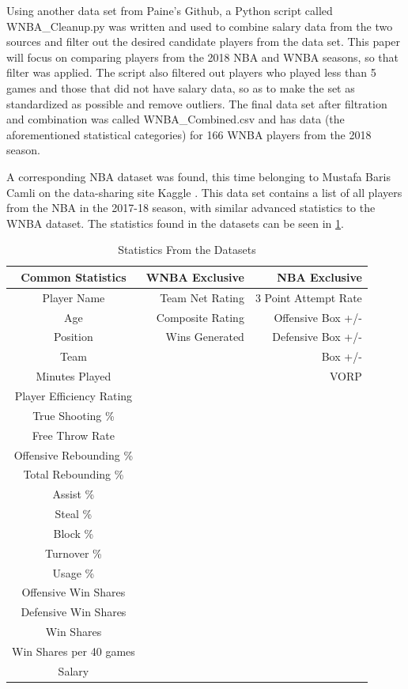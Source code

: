 \documentclass[12pt, titlepage]{article}
\begin{document}
\par
Using another data set from Paine’s Github, a Python script called WNBA\_Cleanup.py was written and used to combine salary data from the two sources and 
filter out the desired candidate players from the data set. This paper will focus on comparing players from the 2018 NBA and WNBA seasons, so that filter 
was applied. The script also filtered out players who played less than 5 games and those that did not have salary data, so as to make the set as 
standardized as possible and remove outliers. The final data set after filtration and combination was called WNBA\_Combined.csv and has data (the 
aforementioned statistical categories) for 166 WNBA players from the 2018 season.
\par
A corresponding NBA dataset was found, this time belonging to Mustafa Baris Camli on the data-sharing site Kaggle \citep{nba}. This data set contains a 
list of all players from the NBA in the 2017-18 season, with similar advanced statistics to the WNBA dataset. The statistics found in the datasets can be 
seen in \ref{tab:stats}.

\begin{table}[tbp]
    \caption{Statistics From the Datasets}
    \label{tab:stats}
\centering
\begin{tabular}{crr}
\toprule

Common Statistics & WNBA Exclusive & NBA Exclusive\\ 
\midrule
 Player Name  &  Team Net Rating & 3 Point Attempt Rate  \\
 Age &  Composite Rating & Offensive Box +/-      \\ 
 Position &  Wins Generated & Defensive Box +/-\\
 Team &  & Box +/-     \\         
 Minutes Played &  & VORP       \\
 Player Efficiency Rating & &      \\
 True Shooting \% & & \\
 Free Throw Rate & &\\
 Offensive Rebounding \% & & \\
 Total Rebounding \% & & \\
 Assist \% & & \\
 Steal \% & & \\
 Block \% & & \\
 Turnover \% & & \\
 Usage \% & & \\
 Offensive Win Shares & & \\
 Defensive Win Shares  & & \\
 Win Shares & & \\
 Win Shares per 40 games & & \\
 Salary & & \\
 
 \bottomrule
\end{tabular}
\end{table}
\end{document}
